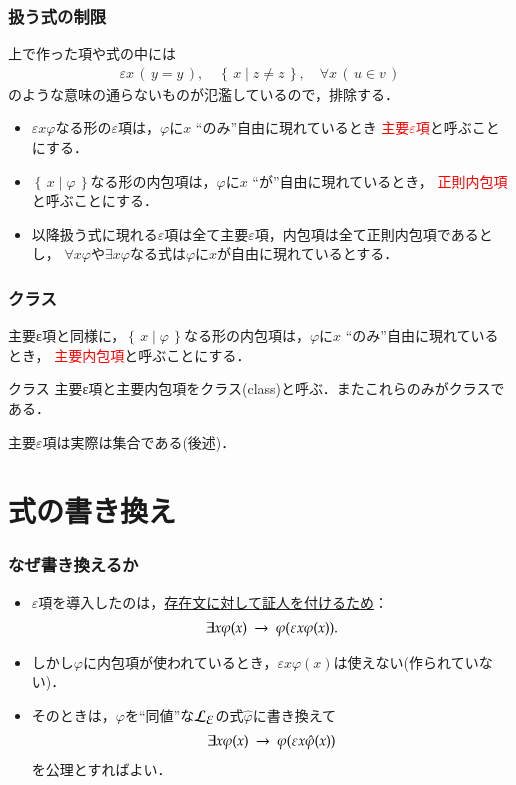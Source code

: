 \documentclass[dvipdfmx,10pt,notheorems]{beamer}
\theoremstyle{definition}
\newcommand{\lang}[1]{\mathcal{L}_{\scalebox{1.2}{$#1$}}} %
\newcommand{\Set}[2]{\left\{\, #1 \mid #2\, \right\}} %
\newcommand{\rarrow}{\hspace{0.25em}\rightarrow\hspace{0.25em}} %
\begin{document}
\begin{frame}\frametitle{扱う式の制限}
	上で作った項や式の中には
	\begin{align}
		\varepsilon x\, (\, y = y\, ),\quad \Set{x}{z \neq z},\quad \forall x\, (\, u \in v\, )
	\end{align}
	のような意味の通らないものが氾濫しているので，排除する．
	
	\begin{itemize}
		\item $\varepsilon x \varphi$なる形の$\varepsilon$項は，$\varphi$に$x$ ``のみ''自由に現れているとき
			\textcolor{red}{主要$\varepsilon$項}と呼ぶことにする．
			
		\item $\Set{x}{\varphi}$なる形の内包項は，$\varphi$に$x$ ``が''自由に現れているとき，
			\textcolor{red}{正則内包項}と呼ぶことにする．
			
		\item 以降扱う式に現れる$\varepsilon$項は全て主要$\varepsilon$項，内包項は全て正則内包項であるとし，
			$\forall x \varphi$や$\exists x \varphi$なる式は$\varphi$に$x$が自由に現れているとする．
	\end{itemize}
\end{frame}

\begin{frame}\frametitle{クラス}
	
	主要ε項と同様に，$\Set{x}{\varphi}$なる形の内包項は，$\varphi$に$x$ ``のみ''自由に現れているとき，
	\textcolor{red}{主要内包項}と呼ぶことにする．
			
	\begin{exampleblock}{クラス}
		主要ε項と主要内包項をクラス(class)と呼ぶ．またこれらのみがクラスである．
	\end{exampleblock}
	
	主要$\varepsilon$項は実際は集合である(後述)．
	
\end{frame}

\section{式の書き換え}
\begin{frame}\frametitle{なぜ書き換えるか}
	\begin{itemize}
		\item $\varepsilon$項を導入したのは，\underline{存在文に対して証人を付けるため}：
			\begin{align}
				\exists x \varphi(x) \rarrow \varphi(\varepsilon x \varphi(x)).
			\end{align}
			
		\item しかし$\varphi$に内包項が使われているとき，$\varepsilon x \varphi(x)$は使えない(作られていない)．
		
		\item そのときは，$\varphi$を``同値''な$\lang{\varepsilon}$の式$\hat{\varphi}$に書き換えて
			\begin{align}
				\exists x \varphi(x) \rarrow \varphi(\varepsilon x \hat{\varphi}(x))
			\end{align}
			を公理とすればよい．
	\end{itemize}
\end{frame}
\end{document}
